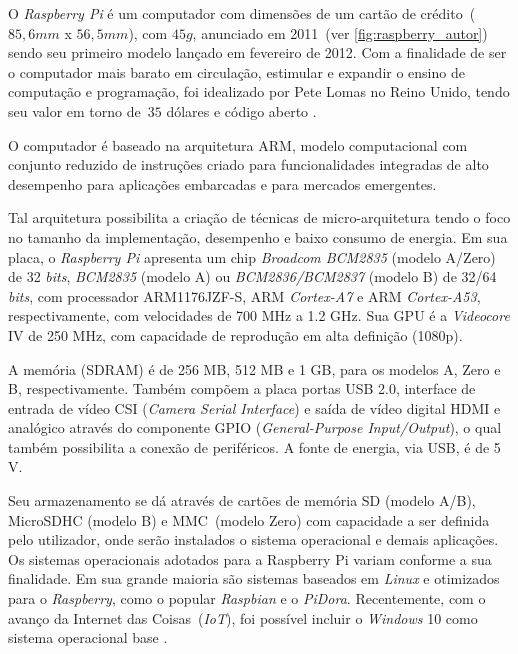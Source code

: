 \documentclass[12pt,oneside,a4paper,chapter=TITLE,section=TITLE,sumario=tradicional]{abntex2}
\begin{document}
O \textit{Raspberry Pi}  é um computador com dimensões de um cartão de crédito~($85,6mm$ x $56,5mm$), com $45g$, anunciado em 2011~(ver \autoref{fig:raspberry_autor}) sendo seu primeiro modelo lançado em fevereiro de 2012. Com a finalidade de ser o computador mais barato em circulação, estimular e expandir o ensino de computação e programação, foi idealizado por Pete Lomas no Reino Unido, tendo seu valor em torno de~$35$ dólares e código aberto \cite{raspberrypi_found}.

\begin{figure}[htb]
    \fonteautor
\end{figure}

O computador é baseado na arquitetura ARM, modelo computacional com conjunto reduzido de instruções criado para funcionalidades integradas de alto desempenho para aplicações embarcadas e para mercados emergentes.

Tal arquitetura possibilita a criação de técnicas de micro-arquitetura tendo o foco no tamanho da implementação, desempenho e baixo consumo de energia. Em sua placa, o \textit{Raspberry Pi} apresenta um chip \textit{Broadcom BCM2835} (modelo A/Zero) de 32 \textit{bits}, \textit{BCM2835} (modelo A) ou \textit{BCM2836/BCM2837} (modelo B) de 32/64 \textit{bits}, com processador ARM1176JZF-S, ARM \textit{Cortex-A7} e ARM \textit{Cortex-A53}, respectivamente, com velocidades de 700 MHz a 1.2 GHz. Sua GPU é a \textit{Videocore} IV de 250 MHz, com capacidade de reprodução em alta definição (1080p). 

A memória (SDRAM) é de 256 MB, 512 MB e 1 GB, para os modelos A, Zero e B, respectivamente. Também compõem a placa portas USB 2.0, interface de entrada de vídeo CSI (\textit{Camera Serial Interface}) e saída de vídeo digital HDMI e analógico através do componente GPIO (\textit{General-Purpose Input/Output}), o qual também possibilita a conexão de periféricos. A fonte de energia, via USB, é de 5 V.

Seu armazenamento se dá através de cartões de memória SD (modelo A/B), MicroSDHC (modelo B) e MMC~(modelo Zero) com capacidade a ser definida pelo utilizador, onde serão instalados o sistema operacional e demais aplicações.
Os sistemas operacionais adotados para a Raspberry Pi variam conforme a sua finalidade. Em sua grande maioria são sistemas baseados em \textit{Linux} e otimizados para o \textit{Raspberry}, como o popular \textit{Raspbian} e o \textit{PiDora}. Recentemente, com o avanço da Internet das Coisas~(\textit{IoT}), foi possível incluir o \textit{Windows} 10 como sistema operacional base
\cite{rapsberripi_}.
\end{document}
